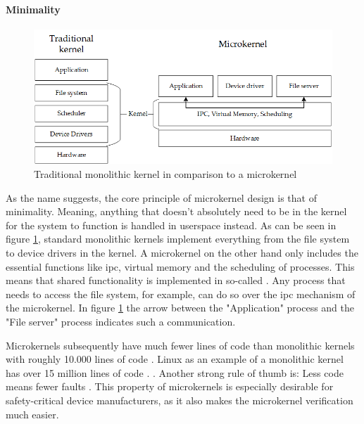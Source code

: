 \paragraph{Minimality}
\begin{figure}
\centering
\includegraphics[scale=0.75]{Figures/microkernel_vs_normal_variant2.png}
\decoRule
\caption{Traditional monolithic kernel in comparison to a microkernel}
\label{fig:microkernel_vs_normal}
\end{figure}
As the name suggests, the core principle of microkernel design is that of minimality. Meaning, anything that doesn't absolutely need to be in the kernel for the system to function is handled in userspace instead. As can be seen in figure \ref{fig:microkernel_vs_normal}, standard monolithic kernels implement everything from the file system to device drivers in the kernel.
A microkernel on the other hand only includes the essential functions like \acrfull{ipc}, virtual memory and the scheduling of processes. This means that shared functionality is implemented in so-called . Any process that needs to access the file system, for example, can do so over the \acrshort{ipc} mechanism of the microkernel. In figure \ref{fig:microkernel_vs_normal} the arrow between the "Application" process and the "File server" process indicates such a communication.

Microkernels subsequently have much fewer lines of code than monolithic kernels with roughly 10.000 lines of code \cite{heiser2016l4}. Linux as an example of a monolithic kernel has over 15 million lines of code \cite{paul2012linux}. . Another strong rule of thumb is: Less code means fewer faults \cite{lipow1982number}. This property of microkernels is especially desirable for safety-critical device manufacturers, as it also makes the microkernel verification much easier.

